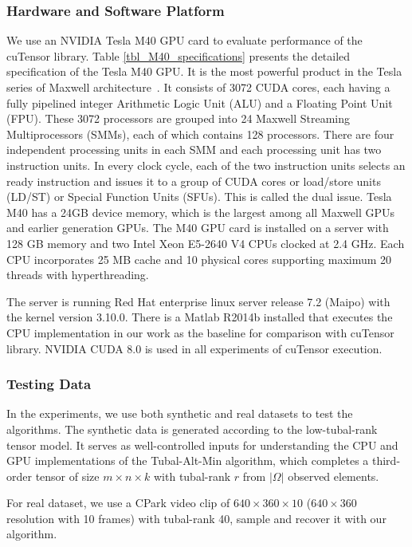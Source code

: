 \documentclass[format=acmsmall, review=false, screen=true]{acmart}
\begin{document}
\subsubsection{Hardware and Software Platform}
We use an NVIDIA Tesla M40 GPU card to evaluate performance of the cuTensor library. Table \ref{tbl_M40_specifications} presents the detailed specification of the Tesla M40 GPU. It is the most powerful product in the Tesla series of Maxwell architecture~\cite{harris2014maxwell}. It consists of 3072 CUDA cores, each having a fully pipelined integer Arithmetic Logic Unit (ALU) and a Floating Point Unit (FPU). These 3072 processors are grouped into 24 Maxwell Streaming Multiprocessors (SMMs), each of which contains 128 processors. There are four independent processing units in each SMM and each processing unit has two instruction units. In every clock cycle, each of the two instruction units selects an ready instruction and issues it to a group of CUDA cores or load/store units (LD/ST) or Special Function Units (SFUs). This is called the dual issue. Tesla M40 has a 24GB device memory, which is the largest among all Maxwell GPUs and earlier generation GPUs. The M40 GPU card is installed on a server with 128 GB memory and two Intel Xeon E5-2640 V4 CPUs clocked at 2.4 GHz. Each CPU incorporates 25 MB cache and 10 physical cores supporting maximum 20 threads with hyperthreading.

The server is running Red Hat enterprise linux server release 7.2 (Maipo) with the kernel version 3.10.0. There is a Matlab R2014b installed that executes the CPU implementation in our work \cite{XiaoYang2016Low} as the baseline for comparison with cuTensor library. NVIDIA CUDA 8.0 \cite{cuda8} is used in all experiments of cuTensor execution.

\subsubsection{Testing Data}
In the experiments, we use both synthetic and real datasets to test the algorithms. The synthetic data is generated according to the low-tubal-rank tensor model. It serves as well-controlled inputs for understanding the CPU and GPU implementations of the Tubal-Alt-Min algorithm, which completes a third-order tensor of size $m \times n \times k$ with tubal-rank $r$ from $|\Omega|$ observed elements.

For real dataset, we use a CPark video \cite{CPark} clip of $640 \times 360 \times 10$ ($640 \times 360$ resolution with 10 frames) with tubal-rank 40, sample and recover it with our algorithm.
\end{document}
